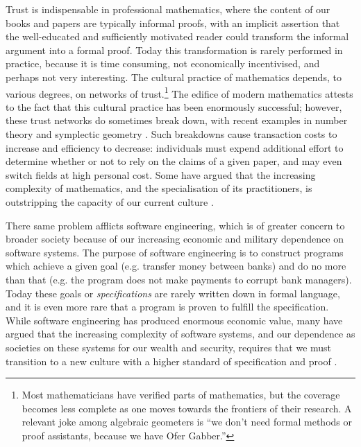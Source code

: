\documentclass[english,letter paper,12pt,reqno]{article}
\theoremstyle{example}
\begin{document}
Trust is indispensable in professional mathematics, where the content of our books and papers are typically informal proofs, with an implicit assertion that the well-educated and sufficiently motivated reader could transform the informal argument into a formal proof. Today this transformation is rarely performed in practice, because it is time consuming, not economically incentivised, and perhaps not very interesting. The cultural practice of mathematics depends, to various degrees, on networks of trust.\footnote{Most mathematicians have verified parts of mathematics, but the coverage becomes less complete as one moves towards the frontiers of their research. A relevant joke among algebraic geometers is ``we don't need formal methods or proof assistants, because we have Ofer Gabber.''} The edifice of modern mathematics attests to the fact that this cultural practice has been enormously successful; however, these trust networks do sometimes break down, with recent examples in number theory \cite{abc} and symplectic geometry \cite{symplectic}. Such breakdowns cause transaction costs to increase and efficiency to decrease: individuals must expend additional effort to determine whether or not to rely on the claims of a given paper, and may even switch fields at high personal cost. Some have argued that the increasing complexity of mathematics, and the specialisation of its practitioners, is outstripping the capacity of our current culture \cite{voevodsky}.

There same problem afflicts software engineering, which is of greater concern to broader society because of our increasing economic and military dependence on software systems. The purpose of software engineering is to construct programs which achieve a given goal (e.g. transfer money between banks) and do no more than that (e.g. the program does not make payments to corrupt bank managers). Today these goals or \emph{specifications} are rarely written down in formal language, and it is even more rare that a program is proven to fulfill the specification. While software engineering has produced enormous economic value, many have argued that the increasing complexity of software systems, and our dependence as societies on these systems for our wealth and security, requires that we must transition to a new culture with a higher standard of specification and proof \cite{manifesto}.
\\
\end{document}
